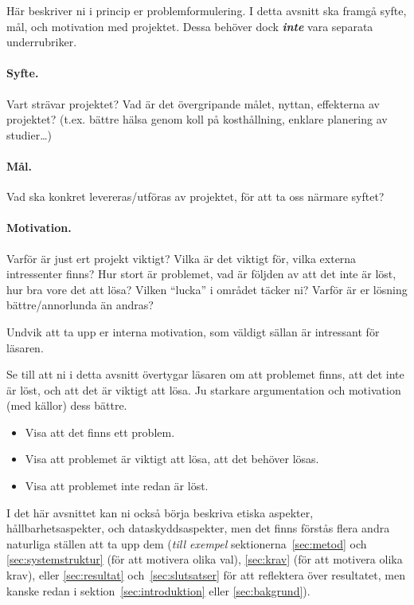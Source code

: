 Här beskriver ni i princip er problemformulering.  I detta avsnitt ska framgå syfte, mål, och motivation med projektet. 
Dessa behöver dock \emph{\textbf{inte}} vara separata underrubriker.

\paragraph{Syfte.} Vart strävar projektet? Vad är det övergripande målet, nyttan, effekterna av projektet?  (t.ex. bättre hälsa genom koll på kosthållning, enklare planering av studier\ldots)
\paragraph{Mål.} Vad ska konkret levereras/utföras av projektet, för att ta oss närmare syftet?
\paragraph{Motivation.}  Varför är just ert projekt viktigt?  Vilka är det viktigt för, vilka externa intressenter finns?  Hur stort är problemet, vad är följden av att det inte är löst, hur bra vore det att lösa?  Vilken ``lucka'' i området täcker ni?
Varför är er lösning bättre/annorlunda än andras?

Undvik att ta upp er interna motivation, som väldigt sällan är intressant för läsaren.

Se till att ni i detta avsnitt övertygar läsaren om att problemet finns, att det inte är löst, och att det är viktigt att lösa. Ju starkare argumentation och motivation (med källor) dess bättre.
\begin{itemize}
\item Visa att det finns ett problem.
\item Visa att problemet är viktigt att lösa, att det behöver lösas.
\item Visa att problemet inte redan är löst.
\end{itemize}

I det här avsnittet kan ni också börja beskriva etiska aspekter, hållbarhetsaspekter, och dataskyddsaspekter, men det finns förstås flera andra naturliga ställen att ta upp dem (\emph{till exempel} sektionerna~\ref{sec:metod} och \ref{sec:systemstruktur} (för att motivera olika val), \ref{sec:krav} (för att motivera olika krav), eller \ref{sec:resultat} och~\ref{sec:slutsatser} för att reflektera över resultatet, men kanske redan i sektion~\ref{sec:introduktion} eller \ref{sec:bakgrund}).

